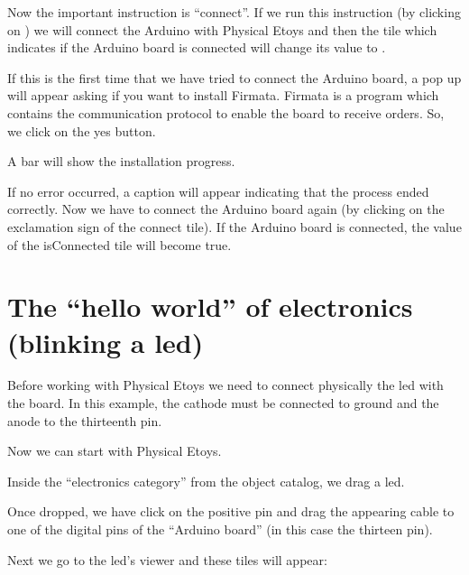 \documentclass[english]{etoys-guide}
\begin{document}


Now the important instruction is “connect”. If we run this instruction (by
clicking on ) we will connect the Arduino with
Physical Etoys and then the tile which indicates if the Arduino board is
connected will change its value to . 


If this is the first time that we have tried to connect the Arduino board, a
pop up will appear asking if you want to install Firmata. Firmata is a program
which contains the communication protocol to enable the board to receive
orders. So, we click on the yes button. 



A bar will show the installation progress.
 

If no error occurred, a caption will appear indicating that the process ended
correctly. Now we have to connect the Arduino board again (by clicking on the
exclamation sign of the connect tile). If the Arduino board is connected, the
value of the isConnected tile will become true. 


\section{The “hello world” of electronics (blinking a led)}

Before working with Physical Etoys we need to connect physically the led with
the board. In this example, the cathode must be connected to ground and the
anode to the thirteenth pin. 



Now we can start with Physical Etoys. 

Inside the “electronics category” from the object catalog, we drag a led. 


Once dropped, we have click on the positive pin and drag the appearing cable to
one of the digital pins of the “Arduino board” (in this case the thirteen pin). 


Next we go to the led’s viewer and these tiles will appear:
\end{document}
